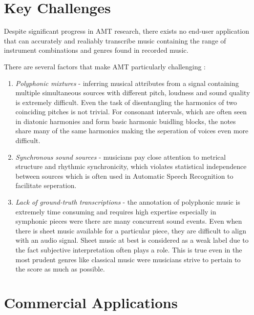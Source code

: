 \section{Key Challenges}

Despite significant progress in \ac{AMT} research, there exists no end-user application that
can accurately and realiably transcribe music containing the range of instrument combinations and
genres found in recorded music.

There are several factors that make AMT particularly challenging :

\begin{enumerate}
      \item \emph{Polyphonic mixtures} - inferring musical attributes from a signal containing
            multiple simultaneous sources with different pitch, loudness and sound quality is extremely difficult. Even the
            task of disentangling the harmonics of two coinciding pitches is not trivial. For consonant intervals, which are often
            seen in diatonic harmonies and form basic harmonic buidling blocks, the notes share many of the same harmonics making the
            seperation of voices even more difficult. \cite{ISMIR-tut:Benetos}
      \item \emph{Synchronous sound sources} - musicians pay close attention to metrical structure and rhythmic synchronicity,
            which violates statistical independence between sources which is often used in Automatic Speech Recognition to facilitate seperation.
      \item \emph{Lack of ground-truth transcriptions} - the annotation of polyphonic music
            is extremely time consuming and requires high expertise especially in symphonic pieces were there
            are many concurrent sound events. Even when there is sheet music available for a particular piece, they
            are difficult to align with an audio signal. Sheet music at best is considered as a weak label due to the fact
            subjective interpretation often plays a role. This is true even in the most prudent genres like classical music were musicians strive to pertain to the
            score as much as possible. \cite{ground-truths:Su}
\end{enumerate}

\section{Commercial Applications}

